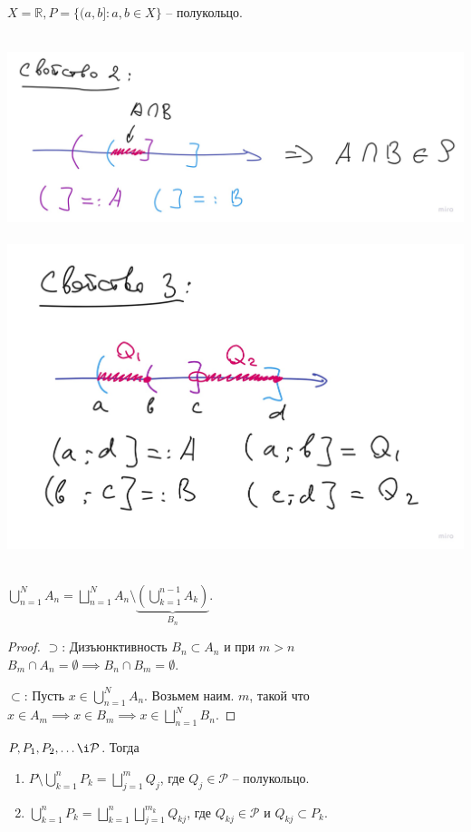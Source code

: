 \begin{example}
    $X = \mathbb{R}, P = \{(a, b] : a, b \in X\}$ -- полукольцо.

    \hbox{
        \includegraphics[scale=0.15]{./assets/01-measure-theory/semicircle-prop-2.jpg}
    }
    \hbox{
        \includegraphics[scale=0.15]{./assets/01-measure-theory/semicircle-prop-3.jpg}
    }

\end{example}

\begin{lemma}
    $\bigcup_{n=1}^{N} A_n = \bigsqcup_{n=1}^{N}A_n \setminus \underbrace{\left(\bigcup_{k=1}^{n-1}A_k\right)}_{B_n}$.
\end{lemma}
\begin{proof}
    $\supset$: Дизъюнктивность $B_n \subset A_n $ и при $m > n$ $B_m \cap A_n = \emptyset \implies B_n \cap B_m = \emptyset$.
    
    $\subset$: Пусть $x \in \bigcup_{n=1}^{N} A_n$. Возьмем наим. $m$, такой что $x \in A_m \implies x \in B_m \implies x \in \bigsqcup_{n=1}^{N} B_n$.
\end{proof}

\begin{theorem}
    $P, P_1, P_2, \dots \i \mathcal{P}$. Тогда 

    \begin{enumerate}
        \item $P \setminus \bigcup_{k=1}^{n} P_k = \bigsqcup_{j=1}^m Q_j$, где $Q_j \in \mathcal{P}$ -- полукольцо.
        \item $\bigcup_{k=1}^{n} P_k = \bigsqcup_{k=1}^{n} \bigsqcup_{j=1}^{m_k} Q_{kj}$, где $Q_{kj} \in \mathcal{P}$ и $Q_{kj} \subset P_k$. 
    \end{enumerate}
\end{theorem}

